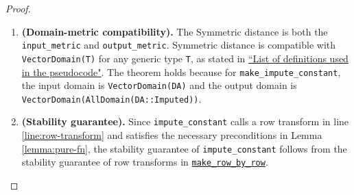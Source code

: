 \documentclass[11pt,a4paper]{article}
\newcommand{\grace}[1]{{ {\color{purple}{(grace)~#1}}}}
\begin{document}
\begin{proof}
\begin{enumerate}
\grace{I didn't use the fact that v is of type DA::Carrier; am I doing something wrong?}

\item \textbf{(Domain-metric compatibility).} The Symmetric distance is both the \texttt{input\_metric} and \texttt{output\_metric}. Symmetric distance is compatible with \texttt{VectorDomain(T)} for any generic type \texttt{T}, as stated in \href{https://www.overleaf.com/project/60d215bf90b337ac02200a99}{``List of definitions used in the pseudocode"}. The theorem holds because for \texttt{make\_impute\_constant}, the input domain is \texttt{VectorDomain(DA)} and the output domain is \texttt{VectorDomain(AllDomain(DA::Imputed))}. 

\item \textbf{(Stability guarantee).} Since \texttt{impute\_constant} calls a row transform in line \ref{line:row-transform} and satisfies the necessary preconditions in Lemma \ref{lemma:pure-fn}, the stability guarantee of \texttt{impute\_constant} follows from the stability guarantee of row transforms in \href{https://www.overleaf.com/2489843918kjvyyytkjfsg}{\texttt{make\_row\_by\_row}}. 

\end{enumerate}
\end{proof}
\end{document}
